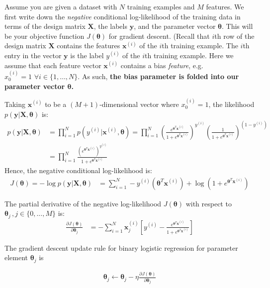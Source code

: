 \documentclass[11pt]{article}
\numberwithin{equation}{section} %
\numberwithin{figure}{section} %
\numberwithin{table}{section} %
\def\x{\mathbf x}
\def\y{\mathbf y}
\newcommand{\xv}{\mathbf{x}}
\newcommand{\yv}{\mathbf{y}}
\newcommand{\Xv}{\mathbf{X}}
\newcommand{\thetav     }{\boldsymbol \theta     }
\begin{document}
 Assume you are given a dataset with $N$ training examples and $M$ features. We first write down the \emph{negative} conditional log-likelihood of the training data in terms of the design matrix $\Xv$, the labels $\yv$, and the parameter vector $\thetav$. This will be your objective function $J(\thetav)$ for gradient descent. 
%
(Recall that $i$th row of the design matrix $\Xv$ contains the features $\xv^{(i)}$ of the $i$th training example. The $i$th entry in the vector $\yv$ is the label $y^{(i)}$ of the $i$th training example.  Here we assume that each feature vector $\xv^{(i)}$ contains a bias \emph{feature}, e.g. $x_0^{(i)} = 1 \,\,\forall i \in \{1,\ldots,N\}$. As such, \textbf{the bias parameter is folded into our parameter vector $\thetav$.}


Taking $\x^{\left(i\right)}$ to be a $(M+1)$-dimensional vector where $x^{(i)}_0=1$, the likelihood $p\left(\y|\mathbf{X},\thetav\right)$ is:
\begin{align}
     p(\y |\mathbf{X},\thetav) &= \prod_{i = 1}^N p(y^{(i)} | \x^{(i)}, \thetav) = \prod_{i = 1}^N \left(\frac{e^{\thetav^T\x^{\left(i\right)}}}{1+e^{\thetav^T\x^{\left(i\right)}}}\right)^{y^{(i)}}\left(\frac{1}{1+e^{\thetav^T\x^{\left(i\right)}}}\right)^{\left(1-y^{(i)}\right)}\\
    &= \prod_{i=1}^N \frac{\left(e^{\thetav^T\x^{\left(i\right)}}\right)^{y^{(i)}}}{1+e^{\thetav^T\x^{\left(i\right)}}}
\end{align}
Hence, the negative conditional log-likelihood is:
\begin{align}
    J(\thetav)= -\log p\left(\y|\mathbf{X},\thetav\right) &= \sum_{i=1}^N  -y^{(i)}\left(\thetav^T\x^{\left(i\right)}\right)+\log\left(1+e^{\thetav^T\x^{\left(i\right)}}\right)
\end{align}


The partial derivative of the negative log-likelihood $J(\thetav)$ with respect to $\thetav_j \,, j\in\{0,...,M\}$ is:
\begin{align}
    \frac{\partial J(\thetav)}{\partial \thetav_j} &= -\sum_{i=1}^N \x_j^{\left(i\right)}\left[y^{(i)}-\frac{e^{\thetav^T\x^{\left(i\right)}}}{1+e^{\thetav^T\x^{\left(i\right)}}}\right]
\end{align}


The gradient descent update rule  for binary logistic regression for parameter element $\thetav_j$ is

\begin{align}
    \thetav_j \leftarrow \thetav_j - \eta \frac{\partial J(\thetav)}{\partial \thetav_j}
\end{align}
\end{document}
